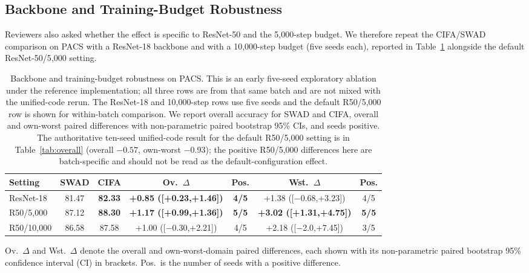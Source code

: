 \documentclass[electronics,article,submit,moreauthors]{Definitions/mdpi}
\begin{document}
\subsection{Backbone and Training-Budget Robustness}

Reviewers also asked whether the effect is specific to ResNet-50 and the 5{,}000-step budget. We therefore repeat the CIFA/SWAD comparison on PACS with a ResNet-18 backbone and with a 10{,}000-step budget (five seeds each), reported in Table~\ref{tab:bbbudget} alongside the default ResNet-50/5{,}000 setting.
\begin{table}[H]
\caption{Backbone and training-budget robustness on PACS. This is an early five-seed exploratory ablation under the reference implementation; all three rows are from that same batch and are not mixed with the unified-code rerun. The ResNet-18 and 10{,}000-step rows use five seeds and the default R50/5{,}000 row is shown for within-batch comparison. We report overall accuracy for SWAD and CIFA, overall and own-worst paired differences with non-parametric paired bootstrap 95\% CIs, and seeds positive. The authoritative ten-seed unified-code result for the default R50/5{,}000 setting is in Table~\protect\ref{tab:overall} (overall $-0.57$, own-worst $-0.93$); the positive R50/5{,}000 differences here are batch-specific and should not be read as the default-configuration effect.}
\label{tab:bbbudget}
\setlength{\tabcolsep}{4.5pt}
\begin{tabular}{lcccccc}
\toprule
\textbf{Setting} & \textbf{SWAD} & \textbf{CIFA} & \textbf{Ov.\ $\Delta$} & \textbf{Pos.} & \textbf{Wst.\ $\Delta$} & \textbf{Pos.}\\
\midrule
ResNet-18 & 81.47 & \textbf{82.33} & \textbf{+0.85 ([+0.23,+1.46])} & \textbf{4/5} & +1.38 ([$-$0.68,+3.23]) & 4/5\\
R50/5{,}000 & 87.12 & \textbf{88.30} & \textbf{+1.17 ([+0.99,+1.36])} & \textbf{5/5} & \textbf{+3.02 ([+1.31,+4.75])} & \textbf{5/5}\\
R50/10{,}000 & 86.58 & 87.58 & +1.00 ([$-$0.30,+2.21]) & 4/5 & +2.18 ([$-$2.0,+7.45]) & 3/5\\
\bottomrule
\end{tabular}
\vspace{2pt}
\footnotesize Ov.\ $\Delta$ and Wst.\ $\Delta$ denote the overall and own-worst-domain paired differences, each shown with its non-parametric paired bootstrap 95\% confidence interval (CI) in brackets. Pos.\ is the number of seeds with a positive difference.
\end{table}
\end{document}
